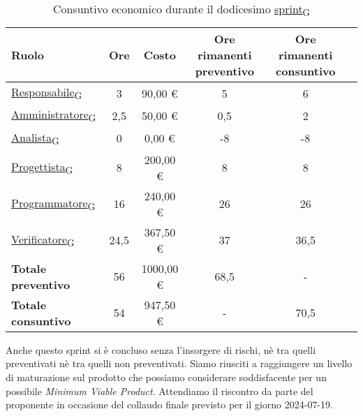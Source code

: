 \newpage
{}
\begin{table}[!h]
    \centering
    \begin{tabular}{ | l | c | c | c | c | c | }
        \hline
        \textbf{Ruolo} & \textbf{Ore} & \textbf{Costo} & \textbf{Ore rimanenti preventivo} & \textbf{Ore rimanenti consuntivo} \\
        \hline
        \href{https://7last.github.io/docs/pb/documentazione-interna/glossario\#responsabile}{Responsabile\textsubscript{G}}     &  3   &   90,00 € &   5   &   6   \\
        \href{https://7last.github.io/docs/pb/documentazione-interna/glossario\#amministratore}{Amministratore\textsubscript{G}} &  2,5 &   50,00 € &   0,5 &   2   \\
        \href{https://7last.github.io/docs/pb/documentazione-interna/glossario\#analista}{Analista\textsubscript{G}}             &  0   &    0,00 € &  -8   &  -8   \\
        \href{https://7last.github.io/docs/pb/documentazione-interna/glossario\#progettista}{Progettista\textsubscript{G}}       &  8   &  200,00 € &   8   &   8   \\
        \href{https://7last.github.io/docs/pb/documentazione-interna/glossario\#programmatore}{Programmatore\textsubscript{G}}   & 16   &  240,00 € &  26   &  26   \\
        \href{https://7last.github.io/docs/pb/documentazione-interna/glossario\#verificatore}{Verificatore\textsubscript{G}}     & 24,5 &  367,50 € &  37   &  36,5 \\
        \hline
        \textbf{Totale preventivo} & 56   & 1000,00 € &  68,5 &   -   \\
        \hline
        \textbf{Totale consuntivo} & 54   &  947,50 € &   -   &  70,5 \\
        \hline
    \end{tabular}
    \caption{Consuntivo economico durante il dodicesimo \href{https://7last.github.io/docs/pb/documentazione-interna/glossario\#sprint}{sprint\textsubscript{G}}}
\end{table}

Anche questo sprint si è concluso senza l'insorgere di rischi, nè tra quelli preventivati nè tra quelli non preventivati. Siamo riusciti a raggiungere un livello di maturazione sul prodotto che possiamo considerare soddisfacente per un possibile \textit{Minimum Viable Product}. Attendiamo il riscontro da parte del proponente in occasione del collaudo finale previsto per il giorno 2024-07-19.


